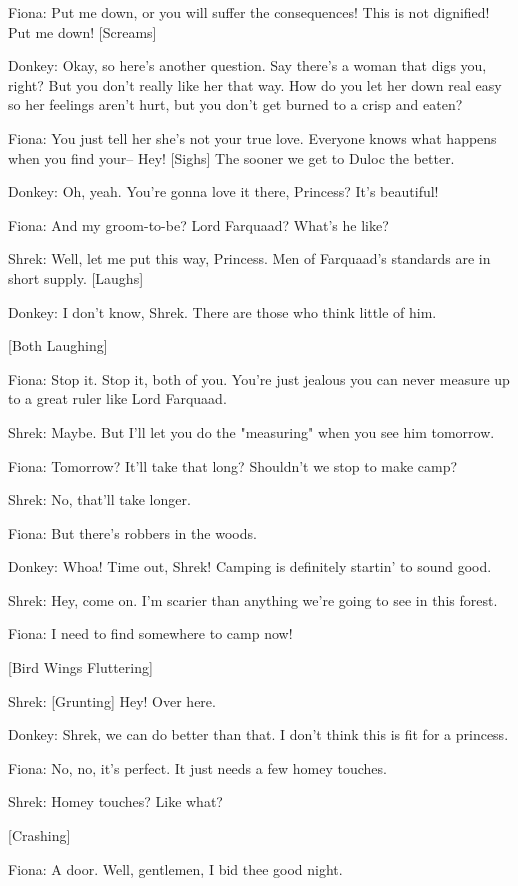 \documentclass{article}
\begin{document}
Fiona:
Put me down, or you will suffer the consequences! This is not dignified! Put me down! [Screams]

Donkey:
Okay, so here's another question. Say there's a woman that digs you, right? But you don't really like her that way. How do you let her down real easy so her feelings aren't hurt, but you don't get burned to a crisp and eaten?

Fiona:
You just tell her she's not your true love. Everyone knows what happens when you find your-- Hey! [Sighs] The sooner we get to Duloc the better.

Donkey:
Oh, yeah. You're gonna love it there, Princess? It's beautiful!

Fiona:
And my groom-to-be? Lord Farquaad? What's he like?

Shrek:
Well, let me put this way, Princess. Men of Farquaad's standards are in short supply. [Laughs]

Donkey:
I don't know, Shrek. There are those who think little of him.

[Both Laughing]

Fiona:
Stop it. Stop it, both of you. You're just jealous you can never measure up to a great ruler like Lord Farquaad.

Shrek:
Maybe. But I'll let you do the "measuring" when you see him tomorrow.

Fiona:
Tomorrow? It'll take that long? Shouldn't we stop to make camp?

Shrek:
No, that'll take longer.

Fiona:
But there's robbers in the woods.

Donkey:
Whoa! Time out, Shrek! Camping is definitely startin' to sound good.

Shrek:
Hey, come on. I'm scarier than anything we're going to see in this forest.

Fiona:
I need to find somewhere to camp now!

[Bird Wings Fluttering]

Shrek:
[Grunting] Hey! Over here.

Donkey:
Shrek, we can do better than that. I don't think this is fit for a princess.

Fiona:
No, no, it's perfect. It just needs a few homey touches.

Shrek:
Homey touches? Like what?

[Crashing]

Fiona:
A door. Well, gentlemen, I bid thee good night.
\end{document}
